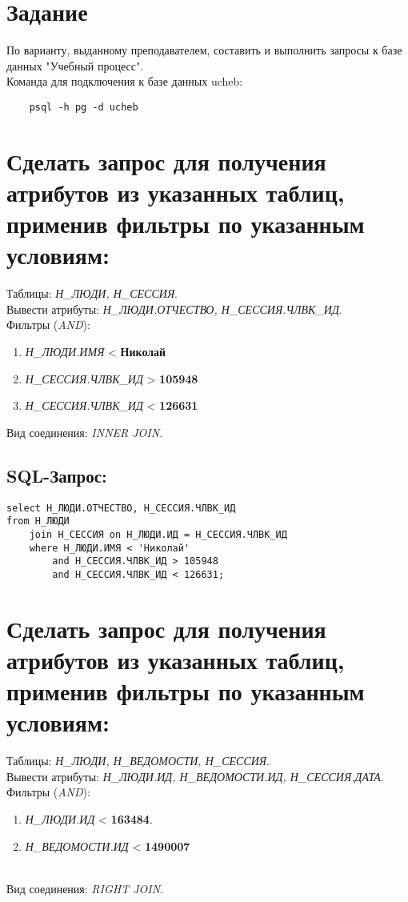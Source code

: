 
\vspace{3cm}
\tableofcontents

\newpage

\section{Задание}

По варианту, выданному преподавателем, составить и выполнить запросы к базе данных "Учебный процесс".\\
Команда для подключения к базе данных ucheb:\\
\begin{verbatim}
	psql -h pg -d ucheb
\end{verbatim}

\newpage
\section{Сделать запрос для получения атрибутов из указанных таблиц, применив фильтры по указанным условиям:}
Таблицы: \textit{Н\_ЛЮДИ, Н\_СЕССИЯ}. \\
Вывести атрибуты: \textit{Н\_ЛЮДИ.ОТЧЕСТВО, Н\_СЕССИЯ.ЧЛВК\_ИД}. \\
Фильтры (\textit{AND}): \\
\begin{enumerate}
	\item \textit{Н\_ЛЮДИ.ИМЯ} < \textbf{Николай}
	\item \textit{Н\_СЕССИЯ.ЧЛВК\_ИД} > \textbf{105948}
	\item \textit{Н\_СЕССИЯ.ЧЛВК\_ИД} < \textbf{126631}
\end{enumerate}
Вид соединения: \textit{INNER JOIN}.

\subsection{SQL-Запрос:}
\begin{verbatim}
select Н_ЛЮДИ.ОТЧЕСТВО, Н_СЕССИЯ.ЧЛВК_ИД
from Н_ЛЮДИ
	join Н_СЕССИЯ on Н_ЛЮДИ.ИД = Н_СЕССИЯ.ЧЛВК_ИД
	where Н_ЛЮДИ.ИМЯ < 'Николай'
		and Н_СЕССИЯ.ЧЛВК_ИД > 105948
		and Н_СЕССИЯ.ЧЛВК_ИД < 126631;
\end{verbatim}

\newpage
\section{Сделать запрос для получения атрибутов из указанных таблиц, применив фильтры по указанным условиям:}
Таблицы: \textit{Н\_ЛЮДИ, Н\_ВЕДОМОСТИ, Н\_СЕССИЯ}. \\
Вывести атрибуты: \textit{Н\_ЛЮДИ.ИД, Н\_ВЕДОМОСТИ.ИД, Н\_СЕССИЯ.ДАТА}. \\
Фильтры (\textit{AND}): \\
\begin{enumerate}
	\item \textit{Н\_ЛЮДИ.ИД} < \textbf{163484}.
	\item \textit{Н_ВЕДОМОСТИ.ИД} < \textbf{1490007}
\end{enumerate}\\
Вид соединения: \textit{RIGHT JOIN}.

